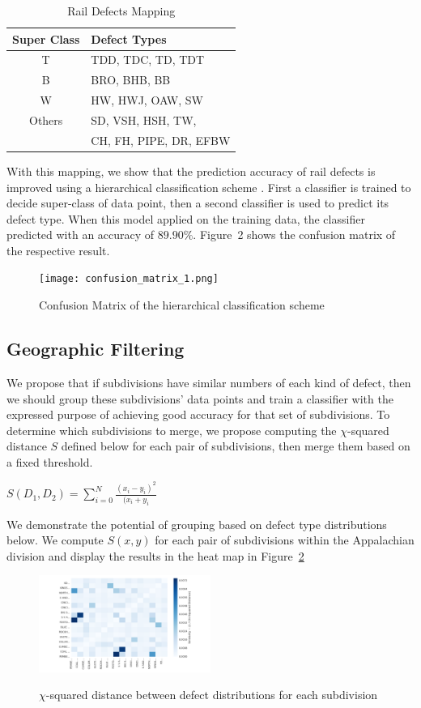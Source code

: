 \documentclass{sig-alternate-05-2015}
\begin{document}
\begin{table}
\label{defect_groups}
\centering
\caption{Rail Defects Mapping}
\begin{tabular}{|c|l|} \hline
Super Class & Defect Types\\ \hline
T & TDD, TDC, TD, TDT\\ \hline
B & BRO, BHB, BB\\ \hline
W & HW, HWJ, OAW, SW\\ \hline
Others & SD, VSH, HSH, TW,\\
  & CH, FH, PIPE, DR, EFBW\\
\hline\end{tabular}
\end{table}

With this mapping, we show that the prediction accuracy of rail defects is improved using a hierarchical classification scheme . First a classifier is trained to decide super-class of data point, then a second classifier is used to predict its defect type. When this model applied on the training data, the classifier predicted with an accuracy of $89.90\%$. Figure~2 shows the confusion matrix of the respective result.

\begin{figure}[ht!]
\texttt{[image: confusion\_matrix\_1.png]}
\label{confusion_matrix_2}
\caption{Confusion Matrix of the hierarchical classification scheme}
\end{figure}


\subsection{Geographic Filtering}
We propose that if subdivisions have similar numbers of each kind of defect, then we should
group these subdivisions' data points and train a classifier with the expressed purpose of 
achieving good accuracy for that set of subdivisions. To determine which subdivisions to merge,
we propose computing the $\chi$-squared distance $S$ defined below for each pair of 
subdivisions, then merge them based on a fixed threshold. 
\begin{center}
    $S(D_1,D_2) = \sum\limits_{i=0}^{N}\frac{(x_i - y_i)^2}{(x_i + y_i}$
\end{center}
We demonstrate the potential of grouping based on defect type distributions below. We compute
$S(x,y)$ for each pair of subdivisions within the Appalachian division and display the results
in the heat map in Figure~\ref{similarity_heatmap}
\begin{figure}[ht!]
\includegraphics[width=0.5\textwidth]{similarity_heatmap.pdf}
\label{similarity_heatmap}
\caption{$\chi$-squared distance between defect distributions for each subdivision}
\end{figure}
\end{document}
